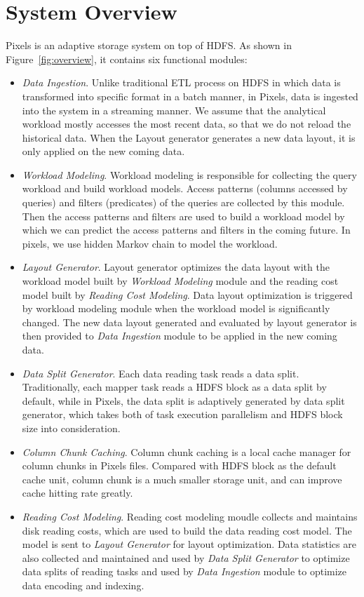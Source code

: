 \section{System Overview}

Pixels is an adaptive storage system on top of HDFS.
As shown in Figure~\ref{fig:overview}, it contains six functional modules:
\begin{itemize}
	\item \textit{Data Ingestion}. Unlike traditional ETL process on HDFS in which data is transformed into specific format in a batch manner, in Pixels, data is ingested into the system in a streaming manner.
	We assume that the analytical workload mostly accesses the most recent data, so that we do not reload the historical data.
	When the Layout generator generates a new data layout, it is only applied on the new coming data.
	
	\item \textit{Workload Modeling}. Workload modeling is responsible for collecting the query workload and build workload models. Access patterns (columns accessed by queries) and filters (predicates) of the queries are collected by this module.
	Then the access patterns and filters are used to build a workload model by which we can predict the access patterns and filters in the coming future. In pixels, we use hidden Markov chain to model the workload.
	
	\item \textit{Layout Generator}. Layout generator optimizes the data layout with the workload model built by \textit{Workload Modeling} module and the reading cost model built by \textit{Reading Cost Modeling}.
	Data layout optimization is triggered by workload modeling module when the workload model is significantly changed.
	The new data layout generated and evaluated by layout generator is then provided to \textit{Data Ingestion} module to be applied in the new coming data.
	
	\item \textit{Data Split Generator}. Each data reading task reads a data split.
	Traditionally, each mapper task reads a HDFS block as a data split by default, while in Pixels, the data split is adaptively generated by data split generator, which takes both of task execution parallelism and HDFS block size into consideration.

	\item \textit{Column Chunk Caching}. Column chunk caching is a local cache manager for column chunks in Pixels files. 
	Compared with HDFS block as the default cache unit, column chunk is a much smaller storage unit, and can improve cache hitting rate greatly.
	
	\item \textit{Reading Cost Modeling}. Reading cost modeling moudle collects and maintains disk reading costs, which are used to build the data reading cost model.
	The model is sent to \textit{Layout Generator} for layout optimization.
	Data statistics are also collected and maintained and used by \textit{Data Split Generator} to optimize data splits of reading tasks and used by \textit{Data Ingestion} module to optimize data encoding and indexing.
\end{itemize}

